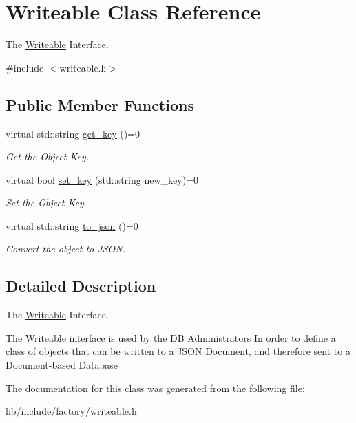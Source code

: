 \hypertarget{classWriteable}{\section{Writeable Class Reference}
\label{classWriteable}
}


The \hyperlink{classWriteable}{Writeable} Interface.  




{\ttfamily \#include $<$writeable.\-h$>$}

\subsection*{Public Member Functions}
\begin{DoxyCompactItemize}
\item 
\hypertarget{classWriteable_ac546538ca16d6448efa54701d4ff8e73}{virtual std\-::string \hyperlink{classWriteable_ac546538ca16d6448efa54701d4ff8e73}{get\-\_\-key} ()=0}\label{classWriteable_ac546538ca16d6448efa54701d4ff8e73}

\begin{DoxyCompactList}\small\item\em Get the Object Key. \end{DoxyCompactList}\item 
\hypertarget{classWriteable_a9332d6b96c8930605ebab49faee06c2f}{virtual bool \hyperlink{classWriteable_a9332d6b96c8930605ebab49faee06c2f}{set\-\_\-key} (std\-::string new\-\_\-key)=0}\label{classWriteable_a9332d6b96c8930605ebab49faee06c2f}

\begin{DoxyCompactList}\small\item\em Set the Object Key. \end{DoxyCompactList}\item 
\hypertarget{classWriteable_a3439d4a6364404cea695b393da1b6d93}{virtual std\-::string \hyperlink{classWriteable_a3439d4a6364404cea695b393da1b6d93}{to\-\_\-json} ()=0}\label{classWriteable_a3439d4a6364404cea695b393da1b6d93}

\begin{DoxyCompactList}\small\item\em Convert the object to J\-S\-O\-N. \end{DoxyCompactList}\end{DoxyCompactItemize}


\subsection{Detailed Description}
The \hyperlink{classWriteable}{Writeable} Interface. 

The \hyperlink{classWriteable}{Writeable} interface is used by the D\-B Administrators In order to define a class of objects that can be written to a J\-S\-O\-N Document, and therefore sent to a Document-\/based Database 

The documentation for this class was generated from the following file\-:\begin{DoxyCompactItemize}
\item 
lib/include/factory/writeable.\-h\end{DoxyCompactItemize}
